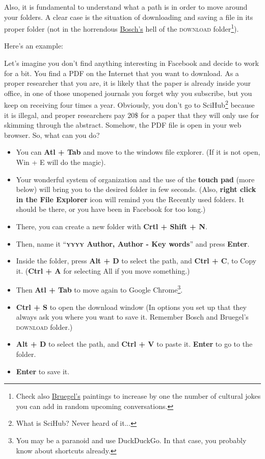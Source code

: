 \documentclass{article}
\begin{document}
Also, it is fundamental to understand what a path is in order to move around your folders. A clear case is the situation of downloading and saving a file in its proper folder (not in the horrendous \href{https://en.wikipedia.org/wiki/Hieronymus_Bosch}{Bosch’s} hell of the \textsc{download} folder\footnote{Check also \href{https://en.wikipedia.org/wiki/Pieter_Bruegel_the_Elder}{Bruegel's} paintings to increase by one the number of cultural jokes you can add in random upcoming conversations.}).

Here’s an example:

Let’s imagine you don’t find anything interesting in Facebook and decide to work for a bit. You find a PDF on the Internet that you want to download. As a proper researcher that you are, it is likely that the paper is already inside your office, in one of those unopened journals you forget why you subscribe, but you keep on receiving four times a year. Obviously, you don’t go to SciHub\footnote{What is SciHub? Never heard of it...} because it is illegal, and proper researchers pay 20\$ for a paper that they will only use for skimming through the abstract. Somehow, the PDF file is open in your web browser. So, what can you do? 

\begin{itemize}
    \item You can \textbf{Atl + Tab} %
    and move to the windows file explorer. (If it is not open, Win + E will do the magic).
    \item Your wonderful system of organization and the use of the \textbf{touch pad} (more below) will bring you to the desired folder in few seconds. (Also, \textbf{right click in the File Explorer} icon will remind you the Recently used folders. It should be there, or you have been in Facebook for too long.)
    \item There, you can create a new folder with \textbf{Crtl + Shift + N}. 
    \item Then, name it ``\textbf{\textsc{yyyy} Author, Author - Key words}'' and press \textbf{Enter}. 
    \item Inside the folder, press \textbf{Alt + D} to select the path, and \textbf{Ctrl + C}, to Copy it. (\textbf{Ctrl + A} for selecting All if you move something.)
    \item Then \textbf{Atl + Tab} %
    to move again to Google Chrome\footnote{You may be a paranoid and use DuckDuckGo. In that case, you probably know about shortcuts already.}.
    \item \textbf{Ctrl + S} to open the download window (In options you set up that they always ask you where you want to save it. Remember Bosch and Bruegel’s \textsc{download} folder.)
    \item \textbf{Alt + D} to select the path, and \textbf{Ctrl + V} to paste it. \textbf{Enter} to go to the folder. 
    \item \textbf{Enter} to save it. 
\end{itemize}
\end{document}
